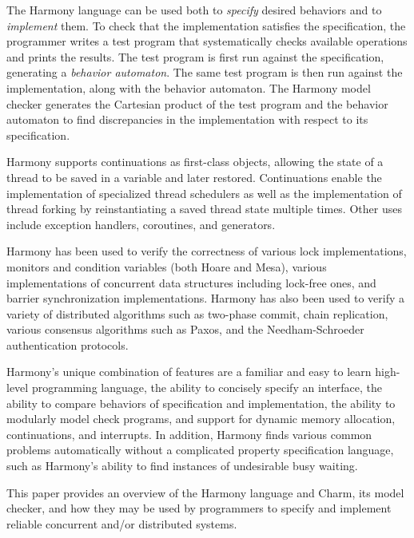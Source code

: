 \documentclass[twocolumn]{article}
\begin{document}
The Harmony language can be used both to \emph{specify} desired
behaviors and to \emph{implement} them.  To check that the implementation
satisfies the specification, the programmer writes a test program that
systematically checks available operations and prints the results.
The test program is first run against the specification, generating
a \emph{behavior automaton}.  The same test program is then run
against the implementation, along with the behavior automaton.
The Harmony model checker generates the Cartesian product of the test program
and the behavior automaton to find discrepancies in the implementation
with respect to its specification.

Harmony supports continuations as first-class objects, allowing the
state of a thread to be saved in a variable and later restored.
Continuations enable the implementation of specialized thread
schedulers as well as the implementation of thread forking by
reinstantiating a saved thread state multiple times.
Other uses include exception handlers, coroutines, and generators.

Harmony has been used to verify the correctness of various lock
implementations, monitors and condition variables (both Hoare and Mesa),
various implementations of concurrent data structures including lock-free
ones, and barrier synchronization implementations.  Harmony has also been
used to verify a variety of distributed algorithms such as two-phase
commit, chain replication, various consensus algorithms such as Paxos,
and the Needham-Schroeder authentication protocols.

Harmony's unique combination of features are a familiar and easy
to learn high-level programming language, the ability to concisely
specify an interface, the ability to compare behaviors of specification
and implementation, the ability to modularly model check programs,
and support for dynamic memory allocation, continuations, and
interrupts.  In addition, Harmony finds various common problems
automatically without a complicated property specification language,
such as Harmony's ability to find instances of undesirable busy
waiting.

This paper provides an overview of the Harmony language and Charm,
its model checker, and how they may be used by programmers to
specify and implement reliable concurrent and/or distributed systems.
\end{document}
